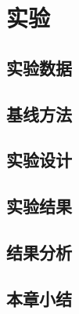 \chapter{实验}
    \section{实验数据}
    \section{基线方法}
    \section{实验设计}
    \section{实验结果}
    \section{结果分析}
    \section{本章小结}